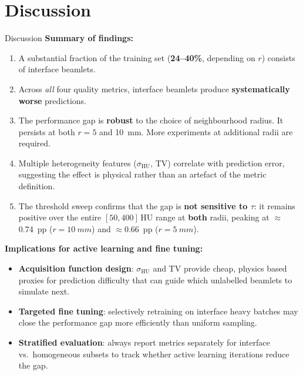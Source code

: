 \documentclass[aspectratio=169, 10pt]{beamer}
\begin{document}
\section{Discussion}

\begin{frame}[shrink=5]{Discussion}
  \textbf{Summary of findings:}
  \begin{enumerate}\setlength{\itemsep}{2pt}
    \item A substantial fraction of the training set (\textbf{24--40\%},
          depending on $r$) consists of interface beamlets.
    \item Across \emph{all} four quality metrics, interface beamlets
          produce \textbf{systematically worse} predictions.
    \item The performance gap is \textbf{robust} to the choice of
          neighbourhood radius. It persists at both $r = 5$ and
          \SI{10}{mm}. More experiments at additional radii are required.
    \item Multiple heterogeneity features ($\sigma_{\text{HU}}$, TV)
          correlate with prediction error, suggesting the effect is
          physical rather than an artefact of the metric definition.
    \item The threshold sweep confirms that the gap is
          \textbf{not sensitive to $\tau$}: it remains positive over the
          entire $[50, 400]$\,HU range at \textbf{both} radii, peaking
          at $\approx$\SI{0.74}{pp} ($r{=}\SI{10}{mm}$) and
          $\approx$\SI{0.66}{pp} ($r{=}\SI{5}{mm}$).
  \end{enumerate}

  \vspace{4pt}
  \textbf{Implications for active learning and fine tuning:}
  \begin{itemize}\setlength{\itemsep}{2pt}
    \item \textbf{Acquisition function design}: $\sigma_{\text{HU}}$
          and TV provide cheap, physics based proxies for prediction
          difficulty that can guide which unlabelled beamlets to
          simulate next.
    \item \textbf{Targeted fine tuning}: selectively retraining on
          interface heavy batches may close the performance gap more
          efficiently than uniform sampling.
    \item \textbf{Stratified evaluation}: always report metrics
          separately for interface vs.\ homogeneous subsets to track
          whether active learning iterations reduce the gap.
  \end{itemize}
\end{frame}
\end{document}
